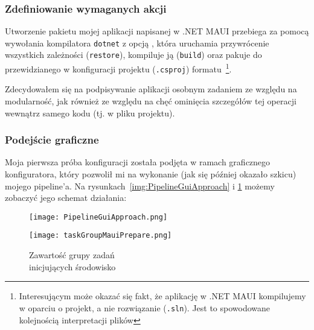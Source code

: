 \subsubsection{Zdefiniowanie wymaganych akcji}
Utworzenie pakietu mojej aplikacji napisanej w .NET MAUI przebiega za pomocą wywołania kompilatora 
\verb|dotnet| z opcją , 
która uruchamia przywrócenie wszystkich zależności (\verb|restore|), 
kompiluje ją (\verb|build|) oraz pakuje do przewidzianego w konfiguracji projektu (\verb|.csproj|) formatu~\cprotect\footnote{%
    Interesującym może okazać się fakt, że aplikację w .NET MAUI kompilujemy w oparciu o projekt, a nie rozwiązanie (\verb|.sln|).
    Jest to spowodowane kolejnością interpretacji plików
}.

Zdecydowałem się na podpisywanie aplikacji osobnym zadaniem ze względu na modularność,
jak również ze względu na chęć ominięcia szczegółów tej operacji wewnątrz samego kodu (tj. w pliku projektu).

\subsubsection{Podejście graficzne}
Moja pierwsza próba konfiguracji została podjęta w ramach graficznego konfiguratora, 
który pozwolił mi na wykonanie (jak się później okazało szkicu) mojego pipeline'a.
Na rysunkach~\ref{img:PipelineGuiApproach} i \ref{img:taskGroupMauiPrepare} możemy zobaczyć jego schemat działania:\\
\begin{figure}[ht]
    \centering
    \begin{minipage}[t]{0.48\textwidth}
        \centering
        \texttt{[image: PipelineGuiApproach.png]}
        \caption{Grupa zadań \\%
        inicjujących środowisko \\%
        (szczegóły na rys.~\ref{img:taskGroupMauiPrepare}) oraz \\%
        publikacja i podpisanie cyfrowe}
        \label{img:PipelineGuiApproach}
    \end{minipage}
    \hfill
    \begin{minipage}[t]{0.47\textwidth}
        \centering
        \texttt{[image: taskGroupMauiPrepare.png]}
        \caption{Zawartość grupy zadań \\inicjujących środowisko}
        \label{img:taskGroupMauiPrepare}
    \end{minipage}
\end{figure}

